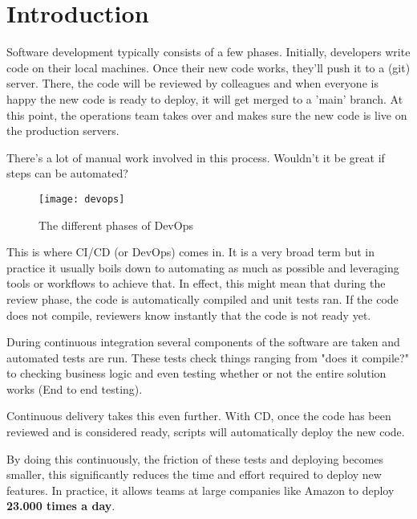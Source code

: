 
\chapter{Introduction} %

\label{Chapter1} 


Software development typically consists of a few phases. Initially, developers write code on their local machines. 
Once their new code works, they'll push it to a (git) server. 
There, the code will be reviewed by colleagues and when everyone is happy the new code is ready to deploy, it will get merged to a 'main' branch.
At this point, the operations team takes over and makes sure the new code is live on the production servers.

There's a lot of manual work involved in this process. Wouldn't it be great if steps can be automated?

\begin{figure}[h!]
	\centering
	\texttt{[image: devops]}
	\caption{The different phases of DevOps \cite*{devops-8}}
	\label{fig:devops}
\end{figure}


This is where CI/CD (or DevOps) comes in. It is a very broad term but in practice it usually boils down to automating as much as possible and leveraging tools or workflows to achieve that.
In effect, this might mean that during the review phase, the code is automatically compiled and unit tests ran. If the code does not compile, reviewers know instantly that the code is not ready yet.

During continuous integration \cite{Duvall-CI} several components of the software are taken and automated tests are run. 
These tests check things ranging from "does it compile?" to checking business logic and even testing whether or not the entire solution works (End to end testing).

Continuous delivery \cite{Humble-CD} takes this even further. With CD, once the code has been reviewed and is considered ready, scripts will automatically deploy the new code.

By doing this continuously, the friction of these tests and deploying becomes smaller, this significantly reduces the time and effort required to deploy new features.
In practice, it allows teams at large companies like Amazon to deploy \textbf{23.000 times a day}. \cite*{phoenix-project}

